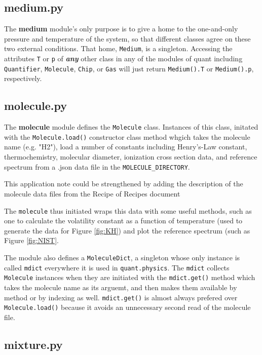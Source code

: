 \documentclass{article}
\newcommand{\code}[1]{\colorbox{codegray}{\lstinline{#1}}}
\begin{document}
\subsection{medium.py}\label{sec:medium}

The \textbf{medium} module's only purpose is to give a home to the one-and-only pressure and temperature of the system, so that different classes agree on these two external conditions. That home, \code{Medium}, is a singleton. Accessing the attributes \code{T} or \code{p} of \textit{\textbf{any}} other class in any of the modules of quant including \code{Quantifier}, \code{Molecule}, \code{Chip}, or \code{Gas} will just return \code{Medium().T} or \code{Medium().p}, respectively.

\subsection{molecule.py}\label{sec:molecule}

The \textbf{molecule} module defines the \code{Molecule} class. Instances of this class, initated with the \code{Molecule.load()} constructor class method whgich takes the molecule name (e.g. "H2"), load a number of constants including Henry's-Law constant, thermochemistry, molecular diameter, ionization cross section data, and reference spectrum from a .json data file in the \code{MOLECULE_DIRECTORY}. 

{\color{red} This application note could be strengthened by adding the description of the molecule data files from the Recipe of Recipes document}

The \code{molecule} thus initiated wraps this data with some useful methods, such as one to calculate the volatility constant as a function of temperature (used to generate the data for Figure \ref{fig:KH}) and plot the reference spectrum (such as Figure \ref{fig:NIST}.

The module also defines a \code{MoleculeDict}, a singleton whose only instance is called \code{mdict} everywhere it is used in \code{quant.physics}. The \code{mdict} collects \code{Molecule} instances when they are initiated with the \code{mdict.get()} method which takes the molecule name as its arguemt, and then makes them available by method or by indexing as well. \code{mdict.get()} is almost always prefered over \code{Molecule.load()} because it avoids an unnecessary second read of the molecule file.

\subsection{mixture.py}\label{sec:mixture}
\end{document}

